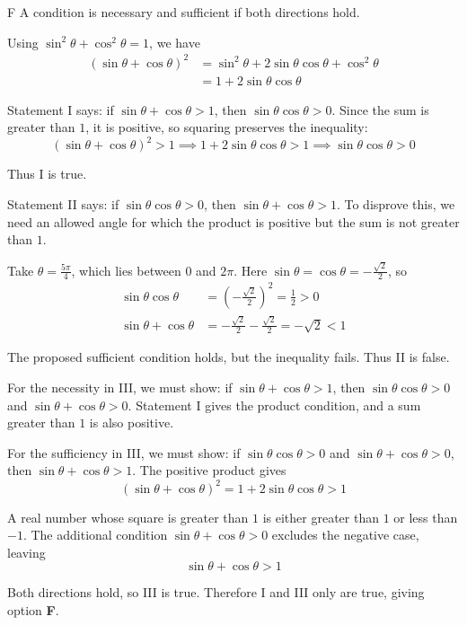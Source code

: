 \documentclass[11pt,a4paper]{article}
\begin{document}
\begin{enumerate}[label=\textbf{\arabic*.},leftmargin=*,itemsep=0pt,start=7]
\begin{djsSolution}{F}
A condition is necessary and sufficient if both directions hold.

Using $\sin^2\theta+\cos^2\theta=1$, we have
\[
\begin{aligned}
(\sin\theta+\cos\theta)^2
&=\sin^2\theta+2\sin\theta\cos\theta+\cos^2\theta\\[5pt]
&=1+2\sin\theta\cos\theta
\end{aligned}
\]

Statement I says: if $\sin\theta+\cos\theta>1$, then $\sin\theta\cos\theta>0$. Since the sum is greater than $1$, it is positive, so squaring preserves the inequality:
\[
(\sin\theta+\cos\theta)^2>1
\implies 1+2\sin\theta\cos\theta>1
\implies \sin\theta\cos\theta>0
\]

Thus I is true.

Statement II says: if $\sin\theta\cos\theta>0$, then $\sin\theta+\cos\theta>1$. To disprove this, we need an allowed angle for which the product is positive but the sum is not greater than $1$.

Take $\theta=\frac{5\pi}{4}$, which lies between $0$ and $2\pi$. Here $\sin\theta=\cos\theta=-\frac{\sqrt2}{2}$, so
\[
\begin{aligned}
\sin\theta\cos\theta
&=\left(-\frac{\sqrt2}{2}\right)^2=\frac12>0\\[8pt]
\sin\theta+\cos\theta
&=-\frac{\sqrt2}{2}-\frac{\sqrt2}{2}=-\sqrt2<1
\end{aligned}
\]

The proposed sufficient condition holds, but the inequality fails. Thus II is false.

For the necessity in III, we must show: if $\sin\theta+\cos\theta>1$, then $\sin\theta\cos\theta>0$ and $\sin\theta+\cos\theta>0$. Statement I gives the product condition, and a sum greater than $1$ is also positive.

For the sufficiency in III, we must show: if $\sin\theta\cos\theta>0$ and $\sin\theta+\cos\theta>0$, then $\sin\theta+\cos\theta>1$. The positive product gives
\[
(\sin\theta+\cos\theta)^2=1+2\sin\theta\cos\theta>1
\]

A real number whose square is greater than $1$ is either greater than $1$ or less than $-1$. The additional condition $\sin\theta+\cos\theta>0$ excludes the negative case, leaving
\[
\sin\theta+\cos\theta>1
\]

Both directions hold, so III is true. Therefore I and III only are true, giving option \textbf{F}.
\end{djsSolution}
\end{enumerate}
\end{document}
